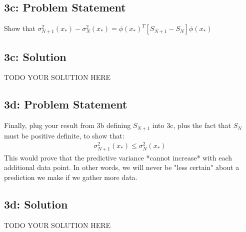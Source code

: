 \documentclass[10pt]{article}
\newcommand{\officialdirections}[1]{{\color{purple} #1}}
\begin{document}
\officialdirections{
\subsection*{3c: Problem Statement}
Show that $\sigma^2_{N+1}(x_*) - \sigma^2_{N}(x_*) = \phi(x_*)^T \left[ S_{N+1} - S_{N} \right] \phi(x_*)$ 
}


\subsection{3c: Solution}
TODO YOUR SOLUTION HERE

\officialdirections{
\subsection*{3d: Problem Statement}
Finally, plug your result from 3b defining $S_{N+1}$ into 3c, plus the fact that $S_N$ must be positive definite, to show that:
\begin{align}
\sigma_{N+1}^2(x_*) \leq \sigma_N^2(x_*)
\end{align}
This would prove that the predictive variance *cannot increase* with each additional data point. In other words, we will never be "less certain" about a prediction we make if we gather more data.
}


\subsection{3d: Solution}
TODO YOUR SOLUTION HERE
\end{document}
